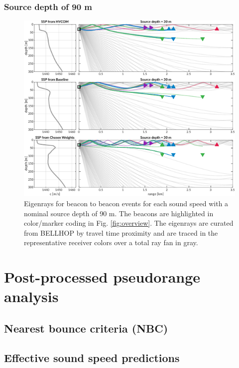 \subsubsection{Source depth of 90 m}
\begin{figure}[h!]
  \centering
  \includegraphics[width=\reprintcolumnwidth]{figs/Fig4.pdf}
  \caption{Eigenrays for beacon to beacon events for each sound speed with a nominal source depth of 90 m. The beacons are highlighted in color/marker coding in Fig. \ref{fig:overview}. The eigenrays are curated from BELLHOP by travel time proximity and are traced in the representative receiver colors over a total ray fan in gray.}
  \label{fig:raytrace-zs90}
\end{figure}

\clearpage
\section{\label{sec:post} Post-processed pseudorange analysis}

\subsection{Nearest bounce criteria (NBC)}

\subsection{Effective sound speed predictions}

